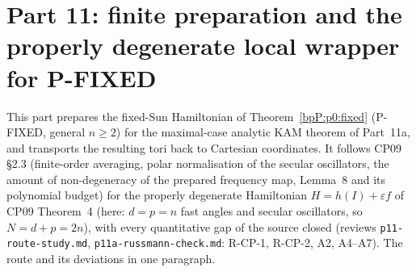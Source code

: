 \section{Part 11: finite preparation and the properly degenerate local wrapper for P-FIXED}\label{bpP:p11}
\begingroup\sloppy

This part prepares the fixed-Sun Hamiltonian of Theorem~\ref{bpP:p0:fixed} (P-FIXED, general $n\ge2$) for the maximal-case analytic KAM theorem of Part~11a, and transports the resulting tori back to Cartesian coordinates. It follows CP09 \S2.3 (finite-order averaging, polar normalisation of the secular oscillators, the amount of non-degeneracy of the prepared frequency map, Lemma~8 and its polynomial budget) for the properly degenerate Hamiltonian $H=h(I)+\varepsilon f$ of CP09 Theorem~4 (here: $d=p=n$ fast angles and secular oscillators, so $N=d+p=2n$), with every quantitative gap of the source closed (reviews \texttt{p11-route-study.md}, \texttt{p11a-russmann-check.md}: R-CP-1, R-CP-2, A2, A4--A7). The route and its deviations in one paragraph.

